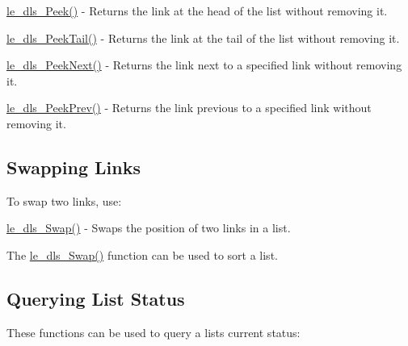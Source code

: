 \begin{DoxyItemize}
\item {\ttfamily \hyperlink{le__doubly_linked_list_8h_ab0a2a83f476727f6aa875e98b213f05c}{le\+\_\+dls\+\_\+\+Peek()}} -\/ Returns the link at the head of the list without removing it.
\item {\ttfamily \hyperlink{le__doubly_linked_list_8h_a366bc41775b9dfe265e79a9ffecd0a86}{le\+\_\+dls\+\_\+\+Peek\+Tail()}} -\/ Returns the link at the tail of the list without removing it.
\item {\ttfamily \hyperlink{le__doubly_linked_list_8h_a3a1a15d3922ec53770f0fde3c8eef9f1}{le\+\_\+dls\+\_\+\+Peek\+Next()}} -\/ Returns the link next to a specified link without removing it.
\item {\ttfamily \hyperlink{le__doubly_linked_list_8h_ad43e69f235920323d725115cb166de34}{le\+\_\+dls\+\_\+\+Peek\+Prev()}} -\/ Returns the link previous to a specified link without removing it.
\end{DoxyItemize}\hypertarget{c_doubly_linked_list_dls_swap}{}\subsection{Swapping Links}\label{c_doubly_linked_list_dls_swap}
To swap two links, use\+:


\begin{DoxyItemize}
\item {\ttfamily \hyperlink{le__doubly_linked_list_8h_ad317fec42c2474b8bef3654c89f3d239}{le\+\_\+dls\+\_\+\+Swap()}} -\/ Swaps the position of two links in a list.
\end{DoxyItemize}

The \hyperlink{le__doubly_linked_list_8h_ad317fec42c2474b8bef3654c89f3d239}{le\+\_\+dls\+\_\+\+Swap()} function can be used to sort a list.\hypertarget{c_doubly_linked_list_dls_query}{}\subsection{Querying List Status}\label{c_doubly_linked_list_dls_query}
These functions can be used to query a list\textquotesingle{}s current status\+:


